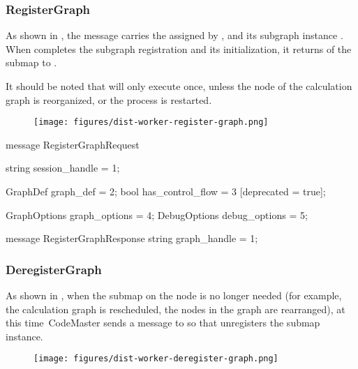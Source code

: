 \begin{content}
\subsubsection{RegisterGraph}
As shown in , the  message carries the  assigned by , and its subgraph instance  . When  completes the subgraph registration and its initialization, it returns  of the submap to .

It should be noted that  will only execute  once, unless the node of the calculation graph is reorganized, or the  process is restarted.

\begin{figure}[H]
  \centering
  \texttt{[image: figures/dist-worker-register-graph.png]}
  \caption{}
  \label{fig:dist-worker-register-graph}
\end{figure}

\begin{leftbar}
\begin{c++}
message RegisterGraphRequest {
  string session_handle = 1;

  GraphDef graph_def = 2;
  bool has_control_flow = 3 [deprecated = true];

  GraphOptions graph_options = 4;
  DebugOptions debug_options = 5;
}

message RegisterGraphResponse {
  string graph_handle = 1;
}
\end{c++}
\end{leftbar}


\subsubsection{DeregisterGraph}
As shown in , when the submap on the  node is no longer needed (for example, the calculation graph is rescheduled, the nodes in the graph are rearranged), at this time\ Code{Master} sends a  message to  so that  unregisters the submap instance.

\begin{figure}[H]
  \centering
  \texttt{[image: figures/dist-worker-deregister-graph.png]}
  \caption{}
  \label{fig:dist-worker-deregister-graph}
\end{figure}


\end{content}
